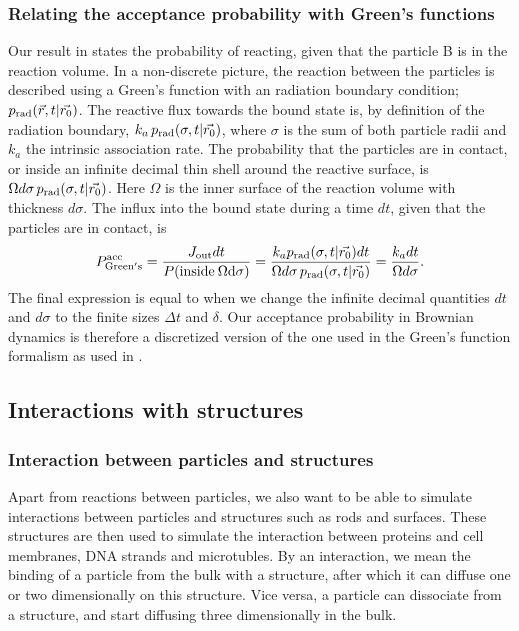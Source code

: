 \subsubsection{Relating the acceptance probability with Green's functions}
Our result in  states the probability of reacting, given that the particle B is in the reaction volume. In a non-discrete picture, the reaction between the particles is described using a Green's function with an radiation boundary condition; $p_{\rm rad}(\vec{r},t|\vec{r_0})$. The reactive flux towards the bound state is, by definition of the radiation boundary, $k_a \, p_{\rm rad}(\sigma,t|\vec{r_0})$, where $\sigma$ is the sum of both particle radii and $k_a$ the intrinsic association rate. The probability that the particles are in contact, or inside an infinite decimal thin shell around the reactive surface, is $\Omega d\sigma \, p_{\rm rad}(\sigma,t|\vec{r_0})$. Here $\Omega$ is the inner surface of the reaction volume with thickness $d\sigma$. The influx into the bound state during a time $dt$, given that the particles are in contact, is \cite{Becker2011}
\begin{equation}
 P^{\rm acc}_{\rm Green's} = \frac{J_{\rm out}dt}{P({\rm inside\:\Omega d\sigma})} = \frac{k_a p_{\rm rad}(\sigma,t|\vec{r_0})dt}{\Omega d\sigma \, p_{\rm rad}(\sigma,t|\vec{r_0})} = \frac{k_a dt}{\Omega d\sigma}.
 \elabel{GFvsBD}
\end{equation}
The final expression is equal to  when we change the infinite decimal quantities $dt$ and $d\sigma$ to the finite sizes $\Delta t$ and $\delta$. Our acceptance probability in Brownian dynamics is therefore a discretized version of the one used in the Green's function formalism as used in \GFRD. 

\subsection{Interactions with structures}

\subsubsection{Interaction between particles and structures}
Apart from reactions between particles, we also want to be able to simulate interactions between particles and structures such as rods and surfaces. These structures are then used to simulate the interaction between proteins and cell membranes, DNA strands and microtubles. By an interaction, we mean the binding of a particle from the bulk with a structure, after which it can diffuse one or two dimensionally on this structure. Vice versa, a particle can dissociate from a structure, and start diffusing three dimensionally in the bulk.

